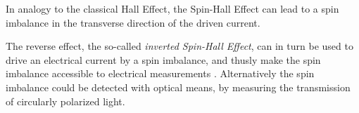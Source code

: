 In analogy to the classical Hall Effect, the Spin-Hall Effect can lead to a
spin imbalance in the transverse direction of the driven current.

The reverse effect, the so-called \emph{inverted Spin-Hall Effect}, can in
turn be used to drive an electrical current by a spin imbalance, and thusly
make the spin imbalance accessible to electrical measurements
\cite{ishe-ew,ISHE}. Alternatively the spin imbalance could be detected with
optical means, by measuring the transmission of circularly polarized light.


%

